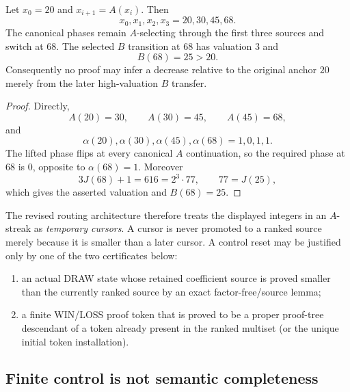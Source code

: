 \begin{lemma}\label{lem:anchor-stress}
Let $x_0=20$ and $x_{i+1}=A(x_i)$.  Then
\[
 x_0,x_1,x_2,x_3=20,30,45,68.
\]
The canonical phases remain $A$-selecting through the first three sources and
switch at $68$.  The selected $B$ transition at $68$ has valuation $3$ and
\[
 B(68)=25>20.
\]
Consequently no proof may infer a decrease relative to the original anchor
$20$ merely from the later high-valuation $B$ transfer.
\end{lemma}

\begin{proof}
Directly,
\[
 A(20)=30,\qquad A(30)=45,\qquad A(45)=68,
\]
and
\[
 \alpha(20),\alpha(30),\alpha(45),\alpha(68)=1,0,1,1.
\]
The lifted phase flips at every canonical $A$ continuation, so the required
phase at $68$ is $0$, opposite to $\alpha(68)=1$.  Moreover
\[
 3J(68)+1=616=2^3\cdot77,
 \qquad 77=J(25),
\]
which gives the asserted valuation and $B(68)=25$.
\end{proof}

The revised routing architecture therefore treats the displayed integers in an
$A$-streak as \emph{temporary cursors}.  A cursor is never promoted to a ranked
source merely because it is smaller than a later cursor.  A control reset may
be justified only by one of the two certificates below:
\begin{enumerate}[label=(R\arabic*)]
\item an actual DRAW state whose retained coefficient source is proved smaller
than the currently ranked source by an exact factor-free/source lemma;
\item a finite WIN/LOSS proof token that is proved to be a proper proof-tree
descendant of a token already present in the ranked multiset (or the unique
initial token installation).
\end{enumerate}

\subsection{Finite control is not semantic completeness}

